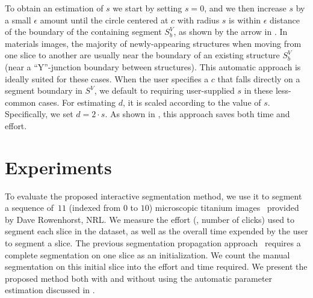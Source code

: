 \documentclass[]{spie}  %
\begin{document}
To obtain an estimation of $s$ we start by setting $s=0$, and we then
increase $s$ by a small $\epsilon$ amount until the circle centered at
$c$ with radius $s$ is within $\epsilon$ distance of the boundary of
the containing segment $S^V_b$, as shown by the arrow in
.  In materials images, the majority of
newly-appearing structures when moving from one slice to another are
usually near the boundary of an existing structure $S^V_b$ (near a
``Y''-junction boundary between structures).  This automatic approach
is ideally suited for these cases.  When the user specifies a $c$ that
falls directly on a segment boundary in $S^V$, we default to requiring
user-supplied $s$ in these less-common cases.  For estimating $d$, it
is scaled according to the value of $s$.  Specifically, we set $d =
2\cdot s$.  As shown in , this approach saves both time and
effort.


\section{Experiments}
\label{sec:ex}

To evaluate the proposed interactive segmentation method, we use it to
segment a sequence of~$11$ (indexed from $0$ to $10$) microscopic
titanium images~\cite{rowenhorst:10} provided by Dave Rowenhorst, NRL.
We measure the effort (\ie, number of clicks) used to segment each
slice in the dataset, as well as the overall time expended by the user
to segment a slice.  The previous segmentation propagation
approach~\cite{waggoner:11} requires a complete segmentation on one
slice as an initialization.  We count the manual segmentation on this
initial slice into the effort and time required.  We present the
proposed method both with and without using the automatic parameter
estimation discussed in .
\end{document}
